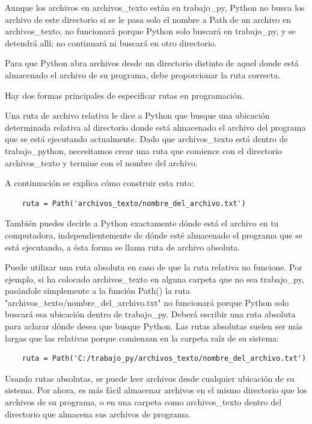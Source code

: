 Aunque los archivos en {\ttfamily archivos\_texto}  están en  {\ttfamily trabajo\_py},  Python no busca los archivo de este directorio si se le pasa solo el nombre a {\ttfamily Path} de un archivo en  {\ttfamily archivos\_texto}, no funcionará porque Python solo buscará en {\ttfamily trabajo\_py}, y se detendrá allí; no continuará ni buscará en otro directorio.

Para que Python abra archivos desde un directorio distinto de aquel donde está almacenado el archivo de su programa, debe proporcionar la ruta correcta.


Hay dos formas principales de especificar rutas en programación.

Una ruta de archivo relativa le dice a Python que busque una ubicación determinada relativa al directorio donde está almacenado el archivo del programa que se está ejecutando actualmente. Dado que {\ttfamily archivos\_texto} está dentro de {\ttfamily trabajo\_python}, necesitamos crear una ruta que comience con el directorio {\ttfamily archivos\_texto} y termine con el nombre del archivo. 

A continuación se explica cómo construir esta ruta:
\begin{lstlisting}
	ruta = Path('archivos_texto/nombre_del_archivo.txt')
\end{lstlisting}

También puedes decirle a Python exactamente dónde está el archivo en tu computadora, independientemente de dónde esté almacenado el programa que se está ejecutando, a ésta forma se llama ruta de archivo absoluta. 

Puede utilizar una ruta absoluta en caso de que la ruta relativa no funcione. Por ejemplo, si ha colocado {\ttfamily archivos\_texto} en alguna carpeta que no sea {\ttfamily trabajo\_py}, pasándole simplemente a la función  {\ttfamily Path()} la ruta  {\ttfamily "{}archivos\_texto/nombre\_del\_archivo.txt{}"{}} no funcionará porque Python solo buscará esa ubicación dentro de  {\ttfamily trabajo\_py}. Deberá escribir una ruta absoluta para aclarar dónde desea que busque Python. Las rutas absolutas suelen ser más largas que las relativas porque comienzan en la carpeta raíz de su sistema:
\begin{lstlisting}
	ruta = Path('C:/trabajo_py/archivos_texto/nombre_del_archivo.txt')
\end{lstlisting}

Usando rutas absolutas, se puede leer archivos desde cualquier ubicación de su sistema. Por ahora, es más fácil almacenar archivos en el mismo directorio que los archivos de su programa, o en una carpeta como {\ttfamily archivos\_texto} dentro del directorio que almacena sus archivos de programa.\\



